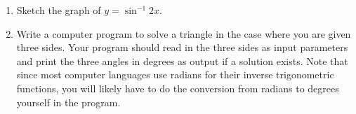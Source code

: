 {\begin{enumerate}[\bfseries 1.]
\begin{figure}[h]
 \begin{center}
  \vspace{-6mm}
 \end{center}
 \caption[]{\quad Exercise \ref{exer:3squares}}
 \label{fig:3squares}
\end{figure}
 \item Sketch the graph of $y=\sin^{-1} 2x$.
 \item Write a computer program to solve a triangle in the case where you are given three sides.
  Your program should read in the three sides as input parameters and print the three
  angles in degrees as output if a solution exists. Note that since most computer languages use
  radians for their inverse trigonometric functions, you will likely have to do the conversion from
  radians to degrees yourself in the program.
\end{enumerate}}
